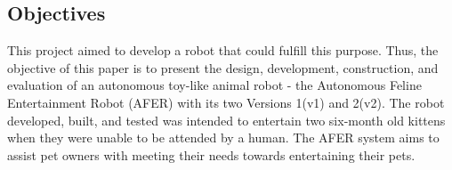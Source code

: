 \subsection{Objectives}
This project aimed to develop a robot that could fulfill this purpose. Thus, the objective of this paper is to present the design, development, construction, and evaluation of an autonomous toy-like animal robot - the Autonomous Feline Entertainment Robot (AFER) with its two Versions 1(v1) and 2(v2). The robot developed, built, and tested was intended to entertain two six-month old kittens when they were unable to be attended by a human. The AFER system aims to assist pet owners with meeting their needs towards entertaining their pets.